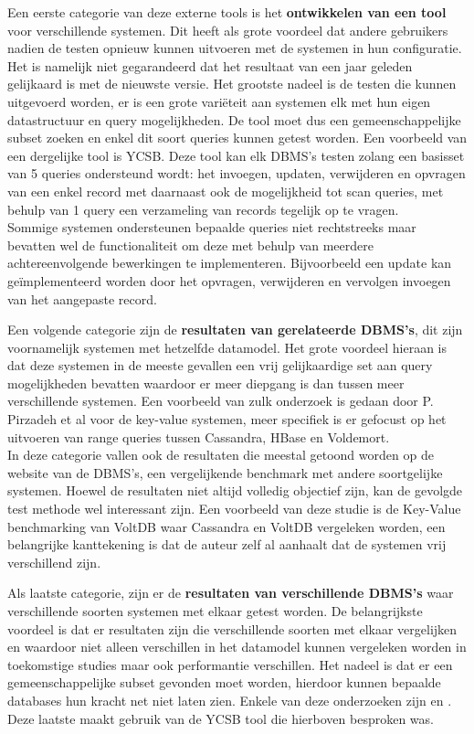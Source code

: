 Een eerste categorie van deze externe tools is het \textbf{ontwikkelen van een tool} voor verschillende systemen. Dit heeft als grote voordeel dat andere gebruikers nadien de testen opnieuw kunnen uitvoeren met de systemen in hun configuratie. Het is namelijk niet gegarandeerd dat het resultaat van een jaar geleden gelijkaard is met de nieuwste versie.
Het grootste nadeel is de testen die kunnen uitgevoerd worden, er is een grote variëteit aan systemen elk met hun eigen datastructuur en query mogelijkheden. De tool moet dus een gemeenschappelijke subset zoeken en enkel dit soort queries kunnen getest worden. Een voorbeeld van een dergelijke tool is YCSB\cite{cooper2010benchmarking}. Deze tool kan elk DBMS's testen zolang een basisset van 5 queries ondersteund wordt: het invoegen, updaten, verwijderen en opvragen van een enkel record met daarnaast ook de mogelijkheid tot scan queries, met behulp van 1 query een verzameling van records tegelijk op te vragen. \\
Sommige systemen ondersteunen bepaalde queries niet rechtstreeks maar bevatten wel de functionaliteit om deze met behulp van meerdere achtereenvolgende bewerkingen te implementeren. Bijvoorbeeld een update kan geïmplementeerd worden door het opvragen, verwijderen en vervolgen invoegen van het aangepaste record. 

Een volgende categorie zijn de \textbf{resultaten van gerelateerde DBMS's}, dit zijn voornamelijk systemen met hetzelfde datamodel. Het grote voordeel hieraan is dat deze systemen in de meeste gevallen een vrij gelijkaardige set aan query mogelijkheden bevatten waardoor er meer diepgang is dan tussen meer verschillende systemen. Een voorbeeld van zulk onderzoek is gedaan door P. Pirzadeh et al\cite{pirzadeh2011performance} voor de key-value systemen, meer specifiek is er gefocust op het uitvoeren van range queries tussen Cassandra, HBase en Voldemort.  \\
In deze categorie vallen ook de resultaten die meestal getoond worden op de website van de DBMS's, een vergelijkende benchmark met andere soortgelijke systemen. Hoewel de resultaten niet altijd volledig objectief zijn, kan de gevolgde test methode wel interessant zijn. Een voorbeeld van deze studie is de Key-Value benchmarking van VoltDB\cite{huggkey} waar Cassandra en VoltDB vergeleken worden, een belangrijke kanttekening is dat de auteur zelf al aanhaalt dat de systemen vrij verschillend zijn.

Als laatste categorie, zijn er de \textbf{resultaten van verschillende DBMS's} waar verschillende soorten systemen met elkaar getest worden. De belangrijkste voordeel is dat er resultaten zijn die verschillende soorten met elkaar vergelijken en waardoor niet alleen verschillen in het datamodel kunnen vergeleken worden in toekomstige studies maar ook performantie verschillen. Het nadeel is dat er een gemeenschappelijke subset gevonden moet worden, hierdoor kunnen bepaalde databases hun kracht net niet laten zien. Enkele van deze onderzoeken zijn \cite{tudorica2011comparison} en \cite{rabl2012solving}. Deze laatste maakt gebruik van de YCSB tool die hierboven besproken was. 


